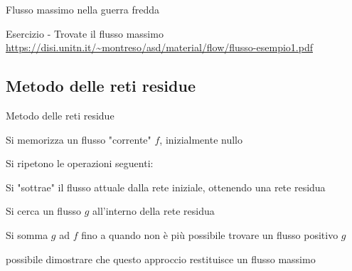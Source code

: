 \begin{frame}{Flusso massimo nella guerra fredda}


\bigskip
{}
\end{frame}

\begin{frame}{Esercizio - Trovate il flusso massimo}
\vspace{-12pt}
\tiny
\url{https://disi.unitn.it/~montreso/asd/material/flow/flusso-esempio1.pdf}
\end{frame}

\subsection{Metodo delle reti residue}


\begin{frame}{Metodo delle reti residue}

\vspace{-9pt}
\begin{myboxtitle}
\BIL
\item Si memorizza un flusso "corrente" $f$, inizialmente nullo
\item Si ripetono le operazioni seguenti:
  \BIL
  \item Si "sottrae" il flusso attuale dalla rete iniziale, ottenendo una
    rete residua
  \item Si cerca un flusso $g$ all'interno della rete residua
  \item Si somma $g$ ad $f$
  \EIL
  fino a quando non è più possibile trovare un flusso positivo $g$
\EIL
\end{myboxtitle}

\begin{myboxtitle}[Output]
\EE possibile dimostrare che questo approccio restituisce
un flusso massimo
\end{myboxtitle}

\end{frame}



